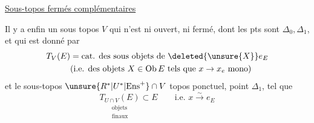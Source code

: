 

\uline{Sous-topos fermés complémentaires}

Il y a enfin un sous topos $V$  qui n'est ni ouvert, ni fermé,  dont les pts sont $\Delta_0,\Delta_1$, et qui  est donné par
\[
 \begin{aligned}
 T_V(E)&=\text{cat. des sous objets de }\deleted{\unsure{X}}e_E\\
 &\text{(i.e. des objets }X\in\operatorname{Ob}E\text{ tels que }x\to x_e\text{ mono)}
 \end{aligned}
\]
et le sous-topos $\unsure{R^*|U^*|\mathrm{Ens}^{+}}\cap V$ \deleted{$\simeq\unsure{\varphi}$} topos ponctuel, point $\Delta_1$, tel que
\[
 \underset{\substack{\text{objets}\\\text{finaux}}}{T_{U\cap V}(E)}\subset E\qquad
 \text{i.e. }x\xrightarrow{\sim}e_E
\]

